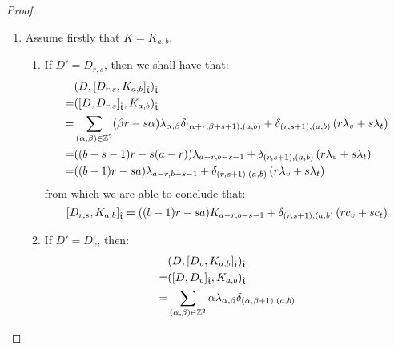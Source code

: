 \begin{proof}
\begin{enumerate}
                    \item Assume firstly that $K = K_{a, b}$.
                    \begin{enumerate}
                        \item If $D' = D_{r, s}$, then we shall have that:
                            $$
                                \begin{aligned}
                                    & ( D, [D_{r, s}, K_{a, b}]_{\extendedtoroidal} )_{\extendedtoroidal}
                                    \\
                                    = & ( [D, D_{r, s}]_{\extendedtoroidal}, K_{a, b} )_{\extendedtoroidal}
                                    \\
                                    = & \sum_{(\alpha, \beta) \in \Z^2} (\beta r - s \alpha) \lambda_{\alpha, \beta} \delta_{(\alpha + r, \beta + s + 1), (a, b)} + \delta_{(r, s + 1), (a, b)} \left( r\lambda_v + s\lambda_t \right)
                                    \\
                                    = & ((b - s - 1) r - s (a - r)) \lambda_{a - r, b - s - 1} + \delta_{(r, s + 1), (a, b)} \left( r\lambda_v + s\lambda_t \right)
                                    \\
                                    = & ((b - 1)r - sa) \lambda_{a - r, b - s - 1} + \delta_{(r, s + 1), (a, b)} \left( r\lambda_v + s\lambda_t \right)
                                \end{aligned}
                            $$
                        from which we are able to conclude that:
                            $$[D_{r, s}, K_{a, b}]_{\extendedtoroidal} = ((b - 1)r - sa) K_{a - r, b - s - 1} + \delta_{(r, s + 1), (a, b)} \left( r c_v + s c_t \right)$$
                        \item If $D' = D_v$, then:
                            $$
                                \begin{aligned}
                                    & ( D, [D_v, K_{a, b}]_{\extendedtoroidal} )_{\extendedtoroidal}
                                    \\
                                    = & ( [D, D_v]_{\extendedtoroidal}, K_{a, b} )_{\extendedtoroidal}
                                    \\
                                    = & \sum_{(\alpha, \beta) \in \Z^2} \alpha \lambda_{\alpha, \beta} \delta_{(\alpha, \beta + 1), (a, b)} 
                                    \\

\end{aligned}$$
\end{enumerate}
\end{enumerate}
\end{proof}
